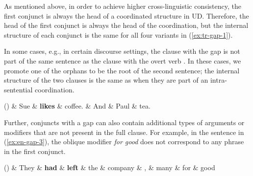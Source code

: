 \documentclass[lucida,biblatex]{sp} %
\newcounter{excounter}
\begin{document}
As mentioned above, in order to achieve higher cross-linguistic consistency, 
the first conjunct is always the head of a coordinated structure in UD. Therefore, 
the head of the first conjunct is always the head of the coordination, but the internal 
structure of each conjunct is the same for all four variants in (\ref{ex:tr-gap-1}).

In some cases, e.g., in certain discourse settings, the clause with the gap is not part 
of the same sentence as the clause with the overt verb \citep{Gerdes2015}. In these 
cases, we promote one of the orphans to be the root of the second sentence; the 
internal structure of the two clauses is the same as when they are part of an intra-sentential 
coordination.

\begin{center}
  \label{ex:en-gap-2}
  \footnotesize
  \begin{dependency}
    \begin{deptext}[column sep=0.3cm]
      (\theexcounter) 
     \& Sue \& \textbf{likes} \& coffee. \& And \& Paul  \& tea. \\
    \end{deptext}
  \end{dependency}
\end{center}

Further, conjuncts with a gap can also contain additional types of arguments or modifiers 
that are not present in the full clause. 
For example, in the sentence in (\ref{ex:en-gap-3}), the oblique modifier \textit{for good} 
does not correspond to any phrase in the first conjunct.

\begin{center}
  \label{ex:en-gap-3}
  \footnotesize
  \begin{dependency}[edge unit distance=2.0ex]
    \begin{deptext}[column sep=0.1cm]
    (\theexcounter) 
    \& They \& \textbf{had} \& \textbf{left} \& the \& company \& , \& many \& for  \& good \\
    \end{deptext}
  \end{dependency}
  \end{center}

\end{document}

